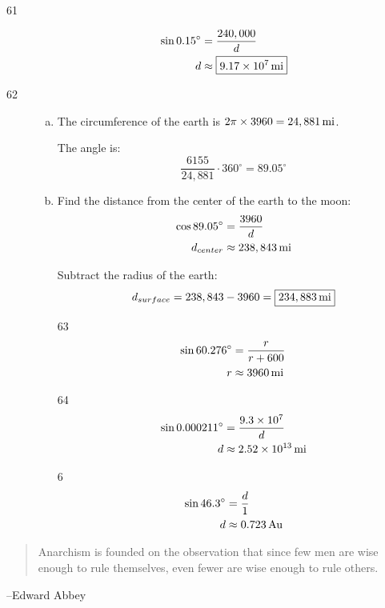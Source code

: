 \documentclass{exam}
\newcommand{\dg}{\ensuremath{^\circ}}
\begin{document}
\begin{description}
      \item[61]
        \begin{align*}
            \sin 0.15 \dg & = \frac{240,000}{d} \\
            d           & \approx \boxed{ \unit[ 9.17 \times 10^7 ]{mi} }  \\
        \end{align*}

      \item[62]
        \begin{enumerate}[(a)]
          \item The circumference of the earth is $2 \pi \times 3960 = \unit[24,881]{mi}$.

            The angle is:
            \[
              \frac{6155}{24,881} \cdot 360 \dg = \boxed{ 89.05 \dg }
            \]

          \item Find the distance from the center of the earth to the moon:
            \begin{align*}
              \cos 89.05 \dg & = \frac{3960}{d} \\
              d_{center}     & \approx \unit[ 238,843 ]{mi} \\
            \end{align*}

            Subtract the radius of the earth:
            \[
              d_{surface} = 238,843 - 3960 = \boxed{ \unit[234,883]{mi} } 
            \]

          \item[63]
            \begin{align*}
              \sin 60.276 \dg & = \frac{r}{r + 600} \\
              r               & \approx \unit[3960]{mi} \\
            \end{align*}

          \item[64]
            \begin{align*}
              \sin 0.000211 \dg & = \frac{9.3 \times 10^7}{d} \\
              d               & \approx \unit[2.52 \times 10^{13}]{mi} \\
            \end{align*}

          \item[6]
            \begin{align*}
              \sin 46.3 \dg & = \frac{d}{1} \\
              d             & \approx \unit[0.723]{Au} \\
            \end{align*}

        \end{enumerate}
    \end{description}

  \else
    \vspace{7 cm}
    \begin{quote}
      \begin{em}
        Anarchism is founded on the observation that since few men are wise enough to rule themselves, even fewer are
        wise enough to rule others.  
      \end{em}
    \end{quote}
    \hspace{1 cm} --Edward Abbey
  \fi
\end{document}
